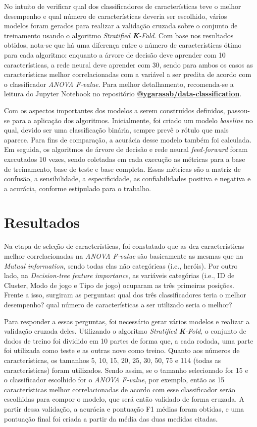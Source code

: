 \documentclass[12pt]{article}
\begin{document}
No intuito de verificar qual dos classificadores de características teve o melhor desempenho e qual número de características deveria ser escolhido, vários modelos foram gerados para realizar a validação cruzada sobre o conjunto de treinamento usando o algoritmo \textit{Stratified \textbf{K}-Fold}. Com base nos resultados obtidos, nota-se que há uma diferença entre o número de características ótimo para cada algoritmo: enquanto a árvore de decisão deve aprender com 10 características, a rede neural deve aprender com 30, sendo para ambos os casos as características melhor correlacionadas com a variável a ser predita de acordo com o classificador \textit{ANOVA F-value}. Para melhor detalhamento, recomenda-se a leitura do Jupyter Notebook no repositório \textbf{\href{https://github.com/ygarasab/data-classification}{@ygarasab/data-classification}}.

Com os aspectos importantes dos modelos a serem construídos definidos, passou-se para a aplicação dos algoritmos. Inicialmente, foi criado um modelo \textit{baseline} no qual, devido ser uma classificação binária, sempre prevê o rótulo que mais aparece. Para fins de comparação, a acurácia desse modelo também foi calculada. Em seguida, os algoritmos de árvore de decisão e rede neural \textit{feed-forward} foram executados 10 vezes, sendo coletadas em cada execução as métricas para a base de treinamento, base de teste e base completa. Essas métricas são a matriz de confusão, a sensibilidade, a especificidade, as confiabilidades positiva e negativa e a acurácia, conforme estipulado para o trabalho. 
	
\section{Resultados}\label{sec:resultados}
Na etapa de seleção de características, foi constatado que as dez características melhor correlacionadas na \textit{ANOVA F-value} são basicamente as mesmas que na \textit{Mutual information}, sendo todas elas não categóricas (i.e., heróis). Por outro lado, na \textit{Decision-tree feature importance}, as variáveis categórias (i.e., ID de Cluster, Modo de jogo e Tipo de jogo) ocuparam as três primeiras posições. Frente a isso, surgiram as perguntas: qual dos três classificadores teria o melhor desempenho? qual número de características a ser utilizado seria o melhor?

Para responder a essas perguntas, foi necessário gerar vários modelos e realizar a validação cruzada deles. Utilizando o algoritmo \textit{Stratified \textbf{K}-Fold}, o conjunto de dados de treino foi dividido em 10 partes de forma que, a cada rodada, uma parte foi utilizada como teste e as outras nove como treino. Quanto aos números de características, os tamanhos 5, 10, 15, 20, 25, 30, 50, 75 e 114 (todas as características) foram utilizados. Sendo assim, se o tamanho selecionado for 15 e o classificador escolhido for o \textit{ANOVA F-value}, por exemplo, então as 15 características melhor correlacionadas de acordo com esse classificador serão escolhidas para compor o modelo, que será então validado de forma cruzada. A partir dessa validação, a acurácia e pontuação F1 médias foram obtidas, e uma pontuação final foi criada a partir da média das duas medidas citadas.
\end{document}
